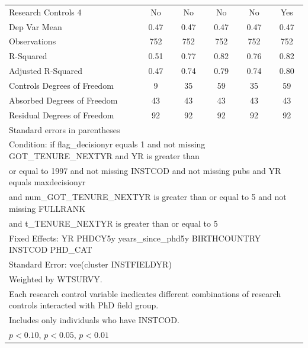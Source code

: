 \begin{table}[htbp]
\begin{tabular}{l*{5}{c}}
Research Controls 4&          No         &          No         &          No         &          No         &         Yes         \\
Dep Var Mean&        0.47         &        0.47         &        0.47         &        0.47         &        0.47         \\
Observations&         752         &         752         &         752         &         752         &         752         \\
R-Squared&        0.51         &        0.77         &        0.82         &        0.76         &        0.82         \\
Adjusted R-Squared&        0.47         &        0.74         &        0.79         &        0.74         &        0.80         \\
Controls Degrees of Freedom&           9         &          35         &          59         &          35         &          59         \\
Absorbed Degrees of Freedom&          43         &          43         &          43         &          43         &          43         \\
Residual Degrees of Freedom&          92         &          92         &          92         &          92         &          92         \\
\hline\hline
\multicolumn{6}{l}{\footnotesize Standard errors in parentheses}\\
\multicolumn{6}{l}{\footnotesize Condition: if flag\_decisionyr equals 1 and not missing GOT\_TENURE\_NEXTYR and YR is greater than}\\
\multicolumn{6}{l}{\footnotesize or equal to 1997 and not missing INSTCOD and not missing pubs and YR equals maxdecisionyr}\\
\multicolumn{6}{l}{\footnotesize and num\_GOT\_TENURE\_NEXTYR is greater than or equal to 5 and not missing FULLRANK}\\
\multicolumn{6}{l}{\footnotesize and t\_TENURE\_NEXTYR is greater than or equal to 5}\\
\multicolumn{6}{l}{\footnotesize Fixed Effects: YR PHDCY5y years\_since\_phd5y BIRTHCOUNTRY INSTCOD PHD\_CAT}\\
\multicolumn{6}{l}{\footnotesize Standard Error: vce(cluster INSTFIELDYR)}\\
\multicolumn{6}{l}{\footnotesize Weighted by WTSURVY.}\\
\multicolumn{6}{l}{\footnotesize Each research control variable incdicates different combinations of research controls interacted with PhD field group.}\\
\multicolumn{6}{l}{\footnotesize Includes only individuals who have INSTCOD.}\\
\multicolumn{6}{l}{\footnotesize \sym{*} \(p<0.10\), \sym{**} \(p<0.05\), \sym{***} \(p<0.01\)}\\
\end{tabular}
\end{table}
